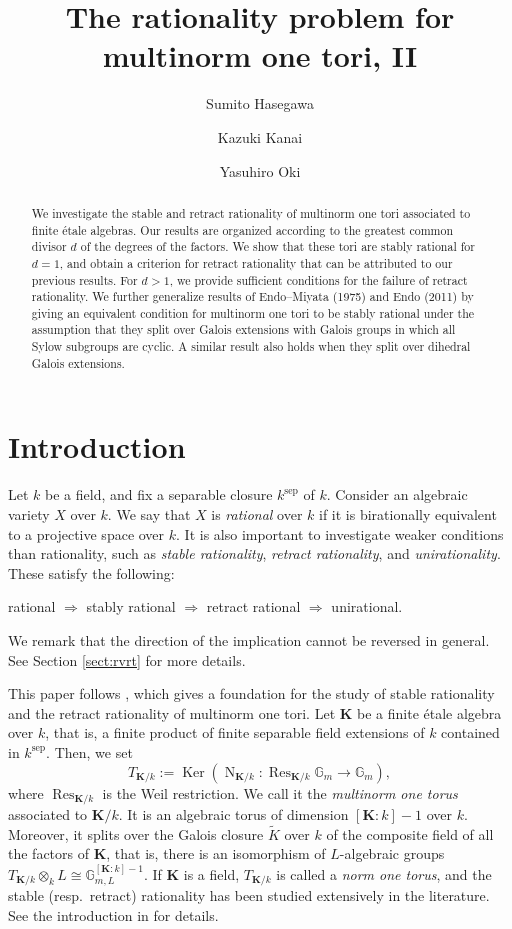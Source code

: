 \documentclass[12pt]{amsart}
\title[Rationality problem, II]{The rationality problem for multinorm one tori, II}
\author[S.~Hasegawa]{Sumito Hasegawa}
\author[K.~Kanai]{Kazuki Kanai}
\author[Y.~Oki]{Yasuhiro Oki}
\theoremstyle{plain}
\theoremstyle{definition}
\numberwithin{thm}{section}
\numberwithin{equation}{section}
\newcommand{\G}{\mathbb{G}}
\newcommand{\bK}{\mathbf{K}}
\DeclareMathOperator{\Ker}{Ker}
\DeclareMathOperator{\N}{N}
\DeclareMathOperator{\Res}{Res}
\DeclareMathOperator{\sep}{sep}
\begin{document}
\begin{abstract}
We investigate the stable and retract rationality of multinorm one tori associated to finite {\'e}tale algebras.
Our results are organized according to the greatest common divisor $d$ of the degrees of the factors. 
We show that these tori are stably rational for $d=1$, and obtain a criterion for retract rationality that can be attributed to our previous results.
For $d>1$, we provide sufficient conditions for the failure of retract rationality. 
We further generalize results of Endo--Miyata (1975) and Endo (2011) by giving an equivalent condition for multinorm one tori to be stably rational under the assumption that they split over Galois extensions with Galois groups in which all Sylow subgroups are cyclic. 
A similar result also holds when they split over dihedral Galois extensions. 
\end{abstract}

\maketitle
\tableofcontents

\section{Introduction}

Let $k$ be a field, and fix a separable closure $k^{\sep}$ of $k$. Consider an algebraic variety $X$ over $k$.
We say that $X$ is \emph{rational} over $k$ if it is birationally equivalent to a projective space over $k$. 
It is also important to investigate weaker conditions than rationality, such as \emph{stable rationality}, \emph{retract rationality}, and \emph{unirationality}.
These satisfy the following:
\begin{center}
rational $\Rightarrow$ stably rational $\Rightarrow$ 
retract rational $\Rightarrow$ unirational. 
\end{center}
We remark that the direction of the implication cannot be reversed in general.
See Section \ref{sect:rvrt} for more details.

This paper follows \cite{Hasegawa}, which gives a foundation for the study of stable rationality and the retract rationality of multinorm one tori. Let $\bK$ be a finite {\'e}tale algebra over $k$, that is, a finite product of finite separable field extensions of $k$ contained in $k^{\sep}$. Then, we set
\begin{equation*}
    T_{\bK/k}:=\Ker(\N_{\bK/k}\colon \Res_{\bK/k}\G_{m}\rightarrow \G_{m}),
\end{equation*}
where $\Res_{\bK/k}$ is the Weil restriction. We call it the \emph{multinorm one torus} associated to $\bK/k$. It is an algebraic torus of dimension $[\bK:k]-1$ over $k$. Moreover, it splits over the Galois closure $\widetilde{K}$ over $k$ of the composite field of all the factors of $\bK$, that is, there is an isomorphism of $L$-algebraic groups $T_{\bK/k}\otimes_{k}L \cong \G_{m,L}^{[\bK:k]-1}$. If $\bK$ is a field, $T_{\bK/k}$ is called a \emph{norm one torus}, and the stable (resp.~retract) rationality has been studied extensively in the literature. See the introduction in \cite{Hasegawa} for details. 
\end{document}
